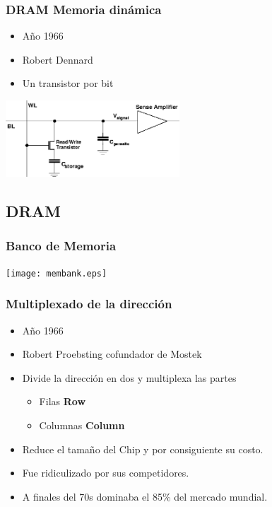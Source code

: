\documentclass{beamer}
\begin{document}
\begin{frame}
\frametitle{DRAM Memoria dinámica}
	\begin{minipage}[c]{4.5cm}
		\begin{center}
			\begin{itemize}
				\item Año 1966
				\item Robert Dennard
				\item Un transistor por bit
			\end{itemize}
		\end{center}
	\end{minipage}
	\begin{minipage}[c]{6.5cm}
		\begin{center}
		\includegraphics[width=6.5cm]{onetransistor.png} 
		\end{center}
	\end{minipage}
\end{frame}

\subsection{DRAM}
\begin{frame}
\frametitle{Banco de Memoria}
	\begin{center}
		\texttt{[image: membank.eps]}
	\end{center}
\end{frame}

\begin{frame}
\frametitle{Multiplexado de la dirección}
	\begin{itemize}
		\item Año 1966
		\item Robert Proebsting cofundador de Mostek
		\item Divide la dirección en dos y multiplexa las partes
			\begin{itemize}
				\item Filas \textbf{Row}
				\item Columnas \textbf{Column}
			\end{itemize}
		\item Reduce el tamaño del Chip y por consiguiente su costo.
		\item Fue ridiculizado por sus competidores.
		\item A finales del 70s dominaba el 85\% del mercado mundial.
	\end{itemize}
\end{frame}
\end{document}
